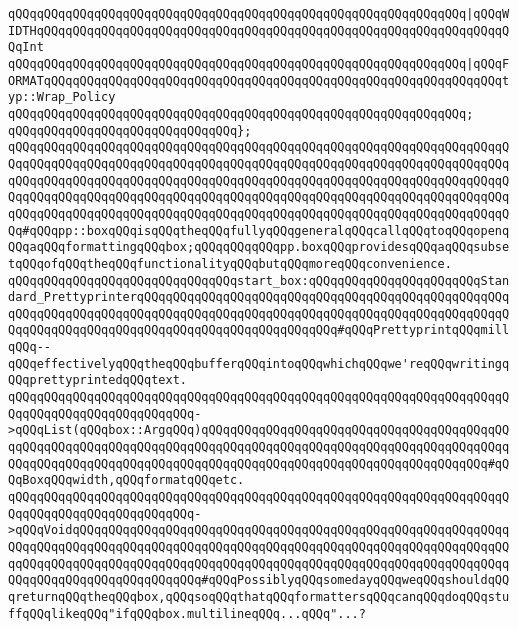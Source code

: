 \verb|qQQqqQQqqQQqqQQqqQQqqQQqqQQqqQQqqQQqqQQqqQQqqQQqqQQqqQQqqQQqqQQq|\verb#|qQQqWIDTHqQQqqQQqqQQqqQQqqQQqqQQqqQQqqQQqqQQqqQQqqQQqqQQqqQQqqQQqqQQqqQQqqQQqInt#\newline
\verb|qQQqqQQqqQQqqQQqqQQqqQQqqQQqqQQqqQQqqQQqqQQqqQQqqQQqqQQqqQQqqQQq|\verb#|qQQqFORMATqQQqqQQqqQQqqQQqqQQqqQQqqQQqqQQqqQQqqQQqqQQqqQQqqQQqqQQqqQQqqQQqtyp::Wrap_Policy#\newline
\verb|qQQqqQQqqQQqqQQqqQQqqQQqqQQqqQQqqQQqqQQqqQQqqQQqqQQqqQQqqQQqqQQq;|\newline
\verb|qQQqqQQqqQQqqQQqqQQqqQQqqQQqqQQq};|\newline
\verb|qQQqqQQqqQQqqQQqqQQqqQQqqQQqqQQqqQQqqQQqqQQqqQQqqQQqqQQqqQQqqQQqqQQqqQQqqQQqqQQqqQQqqQQqqQQqqQQqqQQqqQQqqQQqqQQqqQQqqQQqqQQqqQQqqQQqqQQqqQQqqQQqqQQqqQQqqQQqqQQqqQQqqQQqqQQqqQQqqQQqqQQqqQQqqQQqqQQqqQQqqQQqqQQqqQQqqQQqqQQqqQQqqQQqqQQqqQQqqQQqqQQqqQQqqQQqqQQqqQQqqQQqqQQqqQQqqQQqqQQqqQQqqQQqqQQqqQQqqQQqqQQqqQQqqQQqqQQqqQQqqQQqqQQqqQQqqQQqqQQqqQQqqQQqqQQq#qQQqpp::boxqQQqisqQQqtheqQQqfullyqQQqgeneralqQQqcallqQQqtoqQQqopenqQQqaqQQqformattingqQQqbox;qQQqqQQqqQQqpp.boxqQQqprovidesqQQqaqQQqsubsetqQQqofqQQqtheqQQqfunctionalityqQQqbutqQQqmoreqQQqconvenience.|\newline
\verb|qQQqqQQqqQQqqQQqqQQqqQQqqQQqqQQqstart_box:qQQqqQQqqQQqqQQqqQQqqQQqStandard_PrettyprinterqQQqqQQqqQQqqQQqqQQqqQQqqQQqqQQqqQQqqQQqqQQqqQQqqQQqqQQqqQQqqQQqqQQqqQQqqQQqqQQqqQQqqQQqqQQqqQQqqQQqqQQqqQQqqQQqqQQqqQQqqQQqqQQqqQQqqQQqqQQqqQQqqQQqqQQqqQQqqQQqqQQqqQQq#qQQqPrettyprintqQQqmillqQQq--qQQqeffectivelyqQQqtheqQQqbufferqQQqintoqQQqwhichqQQqwe'reqQQqwritingqQQqprettyprintedqQQqtext.|\newline
\verb|qQQqqQQqqQQqqQQqqQQqqQQqqQQqqQQqqQQqqQQqqQQqqQQqqQQqqQQqqQQqqQQqqQQqqQQqqQQqqQQqqQQqqQQqqQQqqQQq->qQQqList(qQQqbox::ArgqQQq)qQQqqQQqqQQqqQQqqQQqqQQqqQQqqQQqqQQqqQQqqQQqqQQqqQQqqQQqqQQqqQQqqQQqqQQqqQQqqQQqqQQqqQQqqQQqqQQqqQQqqQQqqQQqqQQqqQQqqQQqqQQqqQQqqQQqqQQqqQQqqQQqqQQqqQQqqQQqqQQqqQQqqQQqqQQqqQQqqQQq#qQQqBoxqQQqwidth,qQQqformatqQQqetc.|\newline
\verb|qQQqqQQqqQQqqQQqqQQqqQQqqQQqqQQqqQQqqQQqqQQqqQQqqQQqqQQqqQQqqQQqqQQqqQQqqQQqqQQqqQQqqQQqqQQqqQQq->qQQqVoidqQQqqQQqqQQqqQQqqQQqqQQqqQQqqQQqqQQqqQQqqQQqqQQqqQQqqQQqqQQqqQQqqQQqqQQqqQQqqQQqqQQqqQQqqQQqqQQqqQQqqQQqqQQqqQQqqQQqqQQqqQQqqQQqqQQqqQQqqQQqqQQqqQQqqQQqqQQqqQQqqQQqqQQqqQQqqQQqqQQqqQQqqQQqqQQqqQQqqQQqqQQqqQQqqQQqqQQqqQQqqQQqqQQq#qQQqPossiblyqQQqsomedayqQQqweqQQqshouldqQQqreturnqQQqtheqQQqbox,qQQqsoqQQqthatqQQqformattersqQQqcanqQQqdoqQQqstuffqQQqlikeqQQq"ifqQQqbox.multilineqQQq...qQQq"...?|\newline
